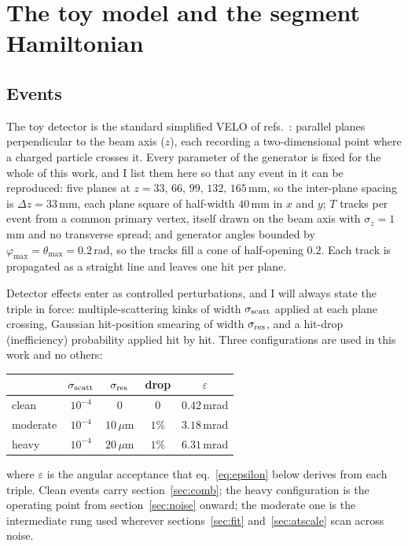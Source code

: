 \documentclass[11pt,a4paper]{article}
\begin{document}
\section{The toy model and the segment Hamiltonian}
\label{sec:toy}

\subsection{Events}
\label{sec:toy:events}

The toy detector is the standard simplified VELO of
refs.~\cite{nicotra2023,trackhhl}: parallel planes perpendicular to the
beam axis ($z$), each recording a two-dimensional point where a charged
particle crosses it. Every parameter of the generator is fixed for the
whole of this work, and I list them here so that any event in it can be
reproduced: five planes at $z=33,\,66,\,99,\,132,\,165$\,mm, so the
inter-plane spacing is $\Delta z=33$\,mm, each plane square of half-width
$40$\,mm in $x$ and $y$; $T$ tracks per event from a common primary
vertex, itself drawn on the beam axis with $\sigma_z=1$\,mm and no
transverse spread; and generator angles bounded by
$\varphi_{\max}=\theta_{\max}=0.2$\,rad, so the tracks fill a cone of
half-opening $0.2$. Each track is propagated as a straight line and
leaves one hit per plane.

Detector effects enter as controlled perturbations, and I will always
state the triple in force: multiple-scattering kinks of width
$\sigma_{\rm scatt}$ applied at each plane crossing, Gaussian
hit-position smearing of width $\sigma_{\rm res}$, and a hit-drop
(inefficiency) probability applied hit by hit. Three configurations are
used in this work and no others:
\begin{center}
\begin{tabular}{lcccc}
\toprule
 & $\sigma_{\rm scatt}$ & $\sigma_{\rm res}$ & drop & $\varepsilon$\\
\midrule
clean    & $10^{-4}$ & $0$            & $0$    & $0.42$\,mrad\\
moderate & $10^{-4}$ & $10\,\mu$m     & $1\%$  & $3.18$\,mrad\\
heavy    & $10^{-4}$ & $20\,\mu$m     & $1\%$  & $6.31$\,mrad\\
\bottomrule
\end{tabular}
\end{center}
where $\varepsilon$ is the angular acceptance that
eq.~\eqref{eq:epsilon} below derives from each triple. Clean events
carry section~\ref{sec:comb}; the heavy configuration is the operating
point from section~\ref{sec:noise} onward; the moderate one is the
intermediate rung used wherever sections~\ref{sec:fit}
and~\ref{sec:atscale} scan across noise.
\end{document}
